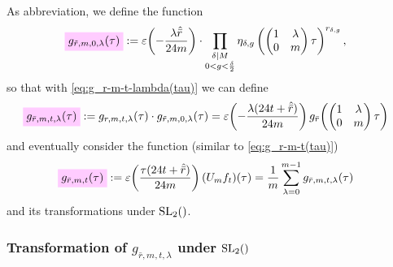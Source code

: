 \documentclass{article}
\begin{document}
As abbreviation, we define the function
\begin{align}
  \defineNotation[g-rtilde-m-0-lambda-tau]{g_{\tilde{r},m,0,\lambda}(\tau)}
  &:=
  \unityPower{-\frac{\lambda \sumdelta{\bar{r}}}{24m}}
    \cdot
    \prod_{\substack{\divides{\delta}{M}\\0 < g < \frac{\delta}{2}}}
  \eta_{\delta,g}
  \left(
  \begin{pmatrix}
    1 & \lambda\\
    0 & m
  \end{pmatrix}
  \tau
  \right)^{r_{\delta,g}},
  \label{eq:g_rtilde-m-0-lambda(tau)}
\end{align}
so that with \eqref{eq:g_r-m-t-lambda(tau)} we can define
\begin{align}
  \defineNotation[g-rbar-m-t-lambda-tau]{g_{\bar{r},m,t,\lambda}(\tau)}
  &:=
  g_{r,m,t,\lambda}(\tau) \cdot g_{\tilde{r},m,0,\lambda}(\tau)
  =
    \unityPower{-\frac{\lambda (24t+\sumdelta{\bar{r}})}{24m}}
    g_{\bar{r}}\!
    \left(
    \begin{pmatrix}
      1 & \lambda\\
      0 & m
    \end{pmatrix}
    \tau
    \right)
  \label{eq:g_rbar-m-t-lambda(tau)}
\end{align}
and eventually consider the function (similar to
\eqref{eq:g_r-m-t(tau)})
\begin{align}
  \defineNotation[g-rbar-m-t-tau]{g_{\bar{r},m,t}(\tau)}
  &:= \unityPower{\frac{\tau (24t+\sumdelta{\bar{r}})}{24m} } (U_mf_t)(\tau)
  =
  \frac{1}{m} \sum_{\lambda=0}^{m-1} g_{\bar{r},m,t,\lambda}(\tau)
  \label{eq:g_rbar-m-t(tau)}
\end{align}
and its transformations under $\SL2Z$.





\subsubsection{Transformation of $g_{\bar{r},m,t,\lambda}$ under $\SL2Z$}
\end{document}
